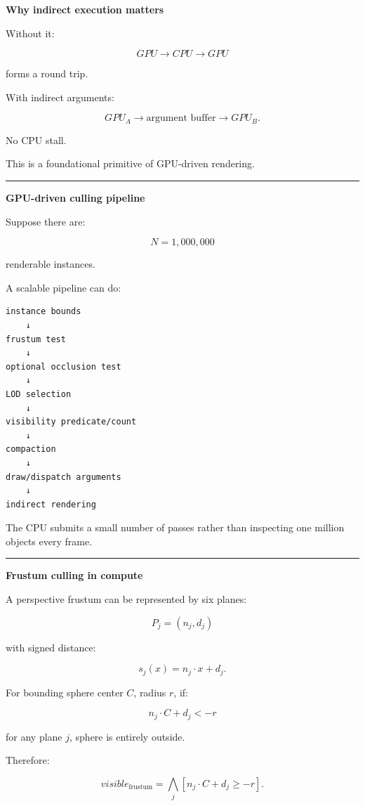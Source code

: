 \textbf{Why indirect execution matters}

Without it:

\[
GPU\rightarrow CPU\rightarrow GPU
\]

forms a round trip.

With indirect arguments:

\[
GPU_A
\rightarrow
\text{argument buffer}
\rightarrow
GPU_B.
\]

No CPU stall.

This is a foundational primitive of GPU-driven rendering.

\begin{center}\rule{0.5\linewidth}{0.5pt}\end{center}

\textbf{GPU-driven culling pipeline}

Suppose there are:

\[
N=1,000,000
\]

renderable instances.

A scalable pipeline can do:

\protect{}\label{p10-cull-pipeline}%
\begin{verbatim}
instance bounds
    ↓
frustum test
    ↓
optional occlusion test
    ↓
LOD selection
    ↓
visibility predicate/count
    ↓
compaction
    ↓
draw/dispatch arguments
    ↓
indirect rendering
\end{verbatim}

The CPU submits a small number of passes rather than inspecting one million objects every frame.

\begin{center}\rule{0.5\linewidth}{0.5pt}\end{center}

\textbf{Frustum culling in compute}

A perspective frustum can be represented by six planes:

\[
P_j=(n_j,d_j)
\]

with signed distance:

\[
s_j(x)
=
n_j\cdot x+d_j.
\]

For bounding sphere center \(C\), radius \(r\), if:

\[
n_j\cdot C+d_j<-r
\]

for any plane \(j\), sphere is entirely outside.

Therefore:

\[
\boxed{
visible_{\text{frustum}}
=
\bigwedge_j
[
n_j\cdot C+d_j\ge-r
].
}
\]

